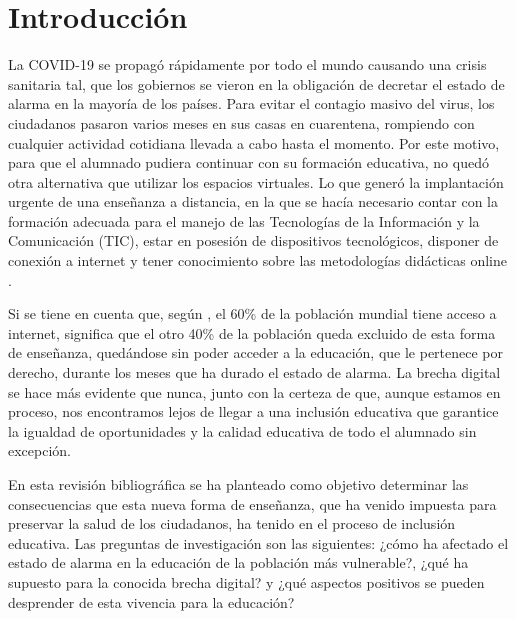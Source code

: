 \documentclass{textolivre}
\begin{document}
\begin{polyabstract}
\begin{english}
\begin{abstract}
\end{abstract}
\end{english}

\end{polyabstract}


\section{Introducción}\label{sec-intro}
La COVID-19 se propagó rápidamente por todo el mundo causando una crisis sanitaria tal, que los gobiernos se vieron en la obligación de decretar el estado de alarma en la mayoría de los países. Para evitar el contagio masivo del virus, los ciudadanos pasaron varios meses en sus casas en cuarentena, rompiendo con cualquier actividad cotidiana llevada a cabo hasta el momento. Por este motivo, para que el alumnado pudiera continuar con su formación educativa, no quedó otra alternativa que utilizar los espacios virtuales. Lo que generó la implantación urgente de una enseñanza a distancia, en la que se hacía necesario contar con la formación adecuada para el manejo de las Tecnologías de la Información y la Comunicación (TIC), estar en posesión de dispositivos tecnológicos, disponer de conexión a internet y tener conocimiento sobre las metodologías didácticas online \cite{rojaslondono2020}.

Si se tiene en cuenta que, según \textcite{globaldigital2020}, el 60\% de la población mundial tiene acceso a internet, significa que el otro 40\% de la población queda excluido de esta forma de enseñanza, quedándose sin poder acceder a la educación, que le pertenece por derecho, durante los meses que ha durado el estado de alarma. La brecha digital se hace más evidente que nunca, junto con la certeza de que, aunque estamos en proceso, nos encontramos lejos de llegar a una inclusión educativa que garantice la igualdad de oportunidades y la calidad educativa de todo el alumnado sin excepción.

En esta revisión bibliográfica se ha planteado como objetivo determinar las consecuencias que esta nueva forma de enseñanza, que ha venido impuesta para preservar la salud de los ciudadanos, ha tenido en el proceso de inclusión educativa. Las preguntas de investigación son las siguientes: ¿cómo ha afectado el estado de alarma en la educación de la población más vulnerable?, ¿qué ha supuesto para la conocida brecha digital? y ¿qué aspectos positivos se pueden desprender de esta vivencia para la educación?
\end{document}
